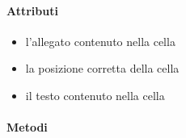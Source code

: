 \paragraph{Attributi}
\begin{itemize}
\item {}
\newline
l'allegato contenuto nella cella
\item {}
\newline
la posizione corretta della cella
\item {}
\newline
il testo contenuto nella cella
\end{itemize}
\paragraph{Metodi}
